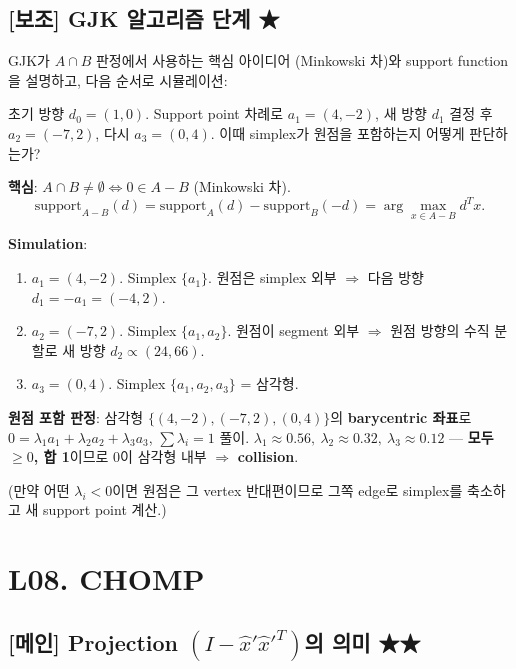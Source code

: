 \documentclass[11pt,a4paper]{article}
\begin{document}
\subsection*{[보조] GJK 알고리즘 단계 \hfill ★}

\begin{prob}
GJK가 $A \cap B$ 판정에서 사용하는 핵심 아이디어 (Minkowski 차)와 support function을 설명하고, 다음 순서로 시뮬레이션:

초기 방향 $d_0 = (1, 0)$. Support point 차례로 $a_1 = (4, -2)$, 새 방향 $d_1$ 결정 후 $a_2 = (-7, 2)$, 다시 $a_3 = (0, 4)$. 이때 simplex가 원점을 포함하는지 어떻게 판단하는가?
\end{prob}

\begin{sol}
\textbf{핵심}: $A \cap B \neq \emptyset \iff 0 \in A - B$ (Minkowski 차).
\[
\mathrm{support}_{A - B}(d) = \mathrm{support}_A(d) - \mathrm{support}_B(-d) = \arg\max_{x \in A - B} d^T x.
\]

\textbf{Simulation}:
\begin{enumerate}
  \item $a_1 = (4, -2)$. Simplex $\{a_1\}$. 원점은 simplex 외부 $\Rightarrow$ 다음 방향 $d_1 = -a_1 = (-4, 2)$.
  \item $a_2 = (-7, 2)$. Simplex $\{a_1, a_2\}$. 원점이 segment 외부 $\Rightarrow$ 원점 방향의 수직 분할로 새 방향 $d_2 \propto (24, 66)$.
  \item $a_3 = (0, 4)$. Simplex $\{a_1, a_2, a_3\}$ = 삼각형.
\end{enumerate}

\textbf{원점 포함 판정}: 삼각형 $\{(4, -2), (-7, 2), (0, 4)\}$의 \textbf{barycentric 좌표}로 $0 = \lambda_1 a_1 + \lambda_2 a_2 + \lambda_3 a_3$, $\sum\lambda_i = 1$ 풀이.
$\lambda_1 \approx 0.56,\ \lambda_2 \approx 0.32,\ \lambda_3 \approx 0.12$ --- \textbf{모두 $\ge 0$, 합 1}이므로 $0$이 삼각형 내부 $\Rightarrow$ \textbf{collision}.

(만약 어떤 $\lambda_i < 0$이면 원점은 그 vertex 반대편이므로 그쪽 edge로 simplex를 축소하고 새 support point 계산.)
\end{sol}

\section{L08. CHOMP}

\subsection*{[메인] Projection $(I - \hat x'\hat x'^T)$의 의미 \hfill ★★}
\end{document}
